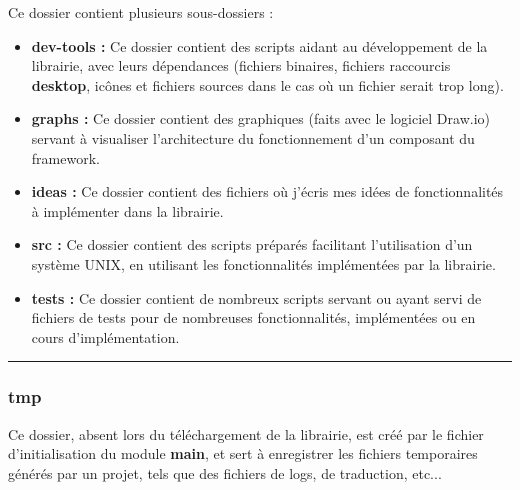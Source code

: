 \documentclass[a4paper,10pt]{article}
\begin{document}
    \begin{justify}
        Ce dossier contient plusieurs sous-dossiers :\\\mbox{}

        \begin{itemize}
            \item \textbf{\color{path}dev-tools\color{text} :} Ce dossier contient des scripts aidant au développement de la librairie, avec leurs dépendances (fichiers binaires, fichiers raccourcis \textbf{desktop}, icônes et fichiers sources dans le cas où un fichier serait trop long).\\\mbox{}

            \item \textbf{\color{path}graphs\color{text} :} Ce dossier contient des graphiques (faits avec le logiciel Draw.io) servant à visualiser l'architecture du fonctionnement d'un composant du framework.\\\mbox{}

            \item \textbf{\color{path}ideas\color{text} :} Ce dossier contient des fichiers où j'écris mes idées de fonctionnalités à implémenter dans la librairie.\\\mbox{}

            \item \textbf{\color{path}src\color{text} :} Ce dossier contient des scripts préparés facilitant l'utilisation d'un système UNIX, en utilisant les fonctionnalités implémentées par la librairie.\\\mbox{}

            \item \textbf{\color{path}tests\color{text} :} Ce dossier contient de nombreux scripts servant ou ayant servi de fichiers de tests pour de nombreuses fonctionnalités, implémentées ou en cours d'implémentation.
        \end{itemize}
    \end{justify}


    \color{sec3}\par\noindent\rule{\textwidth}{0.4pt}\color{text}

    \color{sec3}
    \subsubsection{tmp}\color{text}

    \begin{justify}
        Ce dossier, absent lors du téléchargement de la librairie, est créé par le fichier d'initialisation du module \textbf{main}, et sert à enregistrer les fichiers temporaires générés par un projet, tels que des fichiers de logs, de traduction, etc...
    \end{justify}
\end{document}
